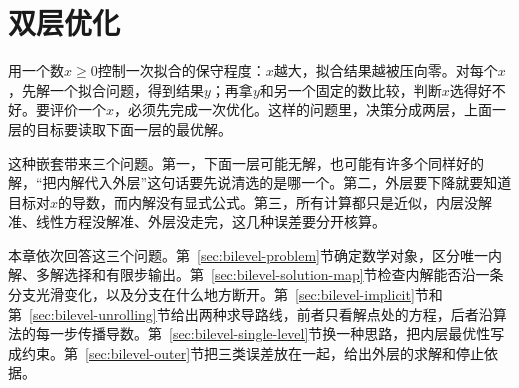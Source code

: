 \chapter{双层优化}
\label{chap:bilevel-optimization}

用一个数$x\geq0$控制一次拟合的保守程度：$x$越大，拟合结果越被压向零。对每个$x$，先解一个拟合问题，得到结果$y$；再拿$y$和另一个固定的数比较，判断$x$选得好不好。要评价一个$x$，必须先完成一次优化。这样的问题里，决策分成两层，上面一层的目标要读取下面一层的最优解。

这种嵌套带来三个问题。第一，下面一层可能无解，也可能有许多个同样好的解，“把内解代入外层”这句话要先说清选的是哪一个。第二，外层要下降就要知道目标对$x$的导数，而内解没有显式公式。第三，所有计算都只是近似，内层没解准、线性方程没解准、外层没走完，这几种误差要分开核算。

本章依次回答这三个问题。第~\ref{sec:bilevel-problem}节确定数学对象，区分唯一内解、多解选择和有限步输出。第~\ref{sec:bilevel-solution-map}节检查内解能否沿一条分支光滑变化，以及分支在什么地方断开。第~\ref{sec:bilevel-implicit}节和第~\ref{sec:bilevel-unrolling}节给出两种求导路线，前者只看解点处的方程，后者沿算法的每一步传播导数。第~\ref{sec:bilevel-single-level}节换一种思路，把内层最优性写成约束。第~\ref{sec:bilevel-outer}节把三类误差放在一起，给出外层的求解和停止依据。








